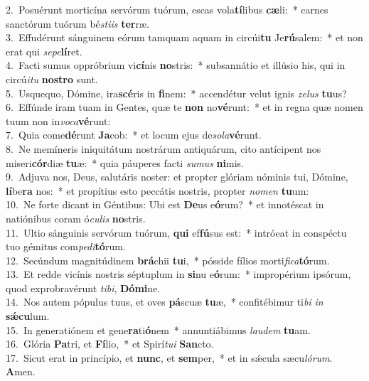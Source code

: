 {2.~}Posuérunt morticína servórum tuórum, escas vola\textbf{tí}libus \textbf{cæ}li:~* carnes sanctórum tuórum bé\textit{sti}\textit{is} \textbf{ter}ræ.\\
{3.~}Effudérunt sánguinem eórum tamquam aquam in circúi\textbf{tu} Je\textbf{rú}salem:~* et non erat qui \textit{se}\textit{pe}\textbf{lí}ret.\\
{4.~}Facti sumus oppróbrium vi\textbf{cí}nis \textbf{no}stris:~* subsannátio et illúsio his, qui in circú\textit{i}\textit{tu} \textbf{no}\textbf{stro} sunt.\\
{5.~}Usquequo, Dómine, ira\textbf{scé}ris in \textbf{fi}nem:~* accendétur velut ignis \textit{ze}\textit{lus} \textbf{tu}us?\\
{6.~}Effúnde iram tuam in Gentes, quæ te \textbf{non} no\textbf{vé}runt:~* et in regna quæ nomen tuum non in\textit{vo}\textit{ca}\textbf{vé}runt:\\
{7.~}Quia come\textbf{dé}runt \textbf{Ja}cob:~* et locum ejus de\textit{so}\textit{la}\textbf{vé}runt.\\
{8.~}Ne memíneris iniquitátum nostrárum antiquárum, cito antícipent nos miseri\textbf{cór}diæ \textbf{tu}æ:~* quia páuperes facti \textit{su}\textit{mus} \textbf{ni}mis.\\
{9.~}Adjuva nos, Deus, salutáris noster: et propter glóriam nóminis tui, Dómine, \textbf{lí}be\textbf{ra} nos:~* et propítius esto peccátis nostris, propter \textit{no}\textit{men} \textbf{tu}um:\\
{10.~}Ne forte dicant in Géntibus: Ubi est \textbf{De}us e\textbf{ó}rum?~* et innotéscat in natiónibus coram ó\textit{cu}\textit{lis} \textbf{no}stris.\\
{11.~}Ultio sánguinis servórum tuórum, \textbf{qui} ef\textbf{fú}sus est:~* intróeat in conspéctu tuo gémitus com\textit{pe}\textit{di}\textbf{tó}rum.\\
{12.~}Secúndum magnitúdinem \textbf{brá}chii \textbf{tu}i,~* pósside fílios morti\textit{fi}\textit{ca}\textbf{tó}rum.\\
{13.~}Et redde vicínis nostris séptuplum in \textbf{si}nu e\textbf{ó}rum:~* impropérium ipsórum, quod exprobravérunt \textit{ti}\textit{bi}, \textbf{Dó}\textbf{mi}ne.\\
{14.~}Nos autem pópulus tuus, et oves \textbf{pá}scuæ \textbf{tu}æ,~* confitébimur ti\textit{bi} \textit{in} \textbf{sǽ}\textbf{cu}lum.\\
{15.~}In generatiónem et gene\textbf{ra}ti\textbf{ó}nem~* annuntiábimus \textit{lau}\textit{dem} \textbf{tu}am.\\
{16.~}Glória \textbf{Pa}tri, et \textbf{Fí}lio,~* et Spirí\textit{tu}\textit{i} \textbf{San}cto.\\
{17.~}Sicut erat in princípio, et \textbf{nunc}, et \textbf{sem}per,~* et in sǽcula sæcu\textit{ló}\textit{rum}. \textbf{A}men.\\
